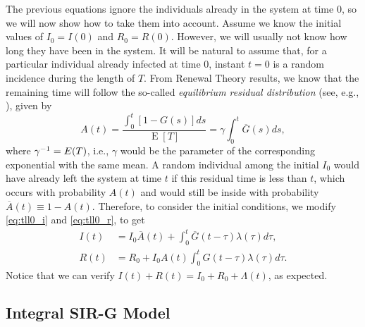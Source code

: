 \documentclass[USenglish,10pt]{article}
\newcommand{\Ab}{\overline{A}\xspace}
\newcommand{\Gb}{\overline{G}\xspace}
\newcommand{\gami}{\ensuremath\gamma^{-1}\xspace}
\DeclareMathOperator{\Exp}{E}       %
\begin{document}
The previous equations ignore the individuals already in the system at time 0, so we will now show how to take them into account.
Assume we know the initial values of $I_0=I(0)$ and $R_0=R(0)$.
However, we will usually not know how long they have been in the system.
It will be natural to assume that, for a particular individual already infected at time $0$, instant $t=0$ is a random incidence during the length of $T$. From Renewal Theory results, we know that the remaining time will follow the so-called \emph{equilibrium residual distribution} (see, e.g., \cite{kulk95}), given by
\begin{equation}
A(t) =  \frac{\int_0^t[1-G(s)]ds}{\Exp{[T]}} = \gamma \int_0^t \Gb(s)ds,
\label{eq:eqdist}
\end{equation}
where $\gami=E(T)$, i.e., $\gamma$ would be the parameter of the corresponding exponential with the same mean. A random individual among the initial $I_0$ would have already left the system at time $t$ if this residual time is less than $t$, which occurs with probability $A(t)$ and would still be inside with probability $\Ab(t)\equiv 1- A(t)$. Therefore, to consider the initial conditions, we modify \eqref{eq:tll0_i} and \eqref{eq:tll0_r}, to get
\begin{align}
I(t) &= I_0\Ab(t) +  \int_0^t \Gb(t-\tau) \lambda(\tau)d\tau,   \label{eq:tll0_i_ic} \\
R(t) &= R_0 +  I_0A(t) \int_0^t G(t-\tau) \lambda(\tau)d\tau.  \label{eq:tll0_r_ic}
\end{align}
Notice that we can verify $I(t)+R(t)= I_0 +  R_0  + \Lambda(t)$, as expected.


\subsection{Integral SIR-G Model}
\end{document}
